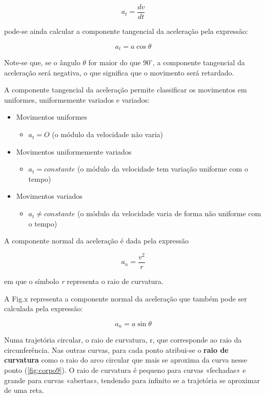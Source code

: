 \documentclass[a4paper,11pt,oneside]{report}
\begin{document}
\[
a_t = \frac{dv}{dt}
\]

\noindent pode-se ainda calcular a componente tangencial da aceleração pela expressão: 

\[
a_t = a\cos \theta
\]

Note-se que, se o ângulo $\theta$ for maior do que $90^\circ$, a componente 
tangencial da aceleração será negativa, o que significa que o movimento será 
retardado.

A componente tangencial da aceleração permite classificar os movimentos em 
uniformes, uniformemente variados e variados:

\begin{itemize}
    \item Movimentos uniformes
     \begin{itemize}
     \item $a_t = O$ (o módulo da velocidade não varia)
     \end{itemize}
    \item Movimentos uniformemente variados
    \begin{itemize}
     \item $a_t = constante$ (o módulo da velocidade tem variação uniforme com o tempo)
    \end{itemize}
    \item Movimentos variados
     \begin{itemize}
     \item $a_t \ne constante$ (o módulo da velocidade varia de forma não uniforme com o tempo)
    \end{itemize}
\end{itemize}

A componente normal da aceleração é dada pela expressão

\[
a_n = \frac{v^2}{r}
\]

\noindent em que o símbolo \textit{r} representa o raio de curvatura.

A Fig.x representa a componente normal da aceleração que também pode ser 
calculada pela expressão:

\[
a_n = a\sin\theta
\]

Numa trajetória circular, o raio de curvatura, r, que corresponde ao raio da
circunferência. Nas outras curvas, para cada ponto atribui-se o \textbf{raio de curvatura} 
como o raio do arco circular que mais se aproxima da curva nesse ponto (\autoref{fig:corpo9}). 
O raio de curvatura é pequeno para curvas «fechadas» e grande para curvas «abertas», 
tendendo para infinito se a trajetória se aproximar de uma reta.
\end{document}
